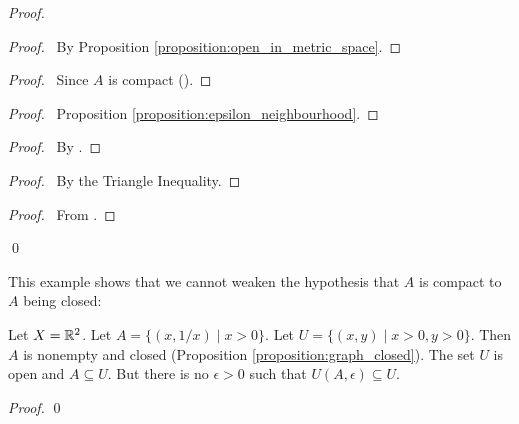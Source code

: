 \begin{proof}
    \pf
    \begin{proof}
        \pf\ By Proposition \ref{proposition:open_in_metric_space}.
    \end{proof}
    \begin{proof}
        \pf\ Since $A$ is compact ().
    \end{proof}
    \begin{proof}
        \pf\ Proposition \ref{proposition:epsilon_neighbourhood}.
    \end{proof}
    \begin{proof}
        \pf\ By .
    \end{proof}
    \begin{proof}
        \pf\ By the Triangle Inequality.
    \end{proof}
    \begin{proof}
        \pf\ From .
    \end{proof}
    \qed
\end{proof}

This example shows that we cannot weaken the hypothesis that $A$ is compact
to $A$ being closed:

\begin{example}
    Let $X = \mathbb{R}^2$. Let $A = \{ (x, 1/x) \mid x > 0 \}$.
    Let $U = \{ (x,y) \mid x > 0, y > 0 \}$. Then $A$ is nonempty
    and closed (Proposition \ref{proposition:graph_closed}).
    The set $U$ is open and $A \subseteq U$. But there is no $\epsilon > 0$
    such that $U(A, \epsilon) \subseteq U$.

    \begin{proof}
        \pf
        \qed
    \end{proof}
\end{example}